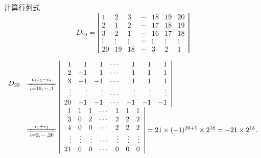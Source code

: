 \documentclass[10pt,a4paper%
tablecaptionabove]{article}
\newcommand{\cd}{\cdots}
\newcommand{\vd}{\vdots}
\begin{document}
\begin{CJK}{UTF8}{gkai}
  \begin{li}
    计算行列式
    $$
    D_{20} = \left|
      \begin{array}{rrrrrrr}
        1   & 2    & 3    & \cd  & 18    & 19    &  20 \\ 
        2   & 1    & 2    & \cd  & 17    & 18    &  19 \\
        3   & 2    & 1    & \cd  & 16    & 17    &  18 \\
        \vd & \vd  & \vd  & \cd  & \vd   & \vd   &  \vd \\
        20  & 19   & 18   & \cd  & 3     & 2     &  1
      \end{array}
    \right|
    $$    
  \end{li}
  \begin{jie}
    $$
    \begin{array}{ll}
      D_{20} &   \xlongequal[i=19,\cd,1]{c_{i+1}-c_i} 
               \left|
               \begin{array}{rrrrrrr}
                 1   & 1    & 1    & \cd  & 1    & 1    &  1 \\ 
                 2   & -1   & 1    & \cd  & 1    & 1    &  1 \\
                 3   & -1   & -1   & \cd  & 1    & 1    &  1 \\
                 \vd & \vd  & \vd  & \cd  & \vd  & \vd  &  \vd \\
                 20  & -1   & -1   & \cd  & -1   & -1   &  -1
               \end{array}
                                                          \right| \\[0.5cm]
             & \xlongequal[i=2,\cd,20]{r_i+r_1} 
               \left|
               \begin{array}{rrrrrrr}
                 1   & 1    & 1    & \cd  & 1    & 1    &  1 \\ 
                 3   & 0    & 2    & \cd  & 2    & 2    &  2 \\
                 4   & 0    & 0    & \cd  & 2    & 2    &  2 \\
                 \vd & \vd  & \vd  & \cd  & \vd  & \vd  &  \vd \\
                 21  & 0    & 0    & \cd  & 0    & 0    &  0
               \end{array}
                                                          \right|
                                                          = 21 \times (-1)^{20+1} \times 2^{18} = -21 \times 2^{18}.
    \end{array}
    $$


\end{jie}
\end{CJK}
\end{document}
